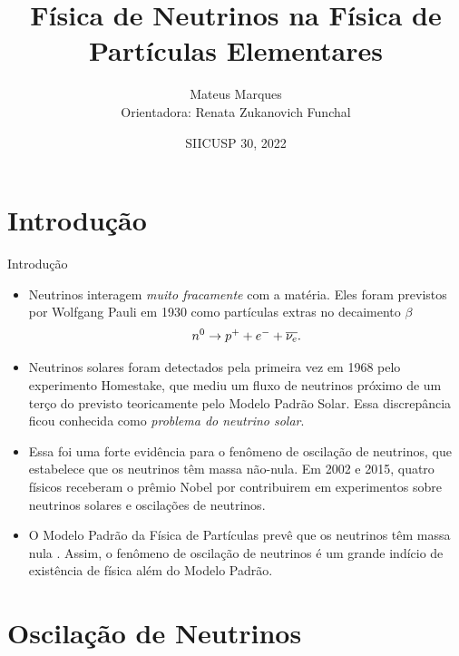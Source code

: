 \documentclass[aspectratio=169]{beamer}
\title[Física de Neutrinos na Física de Partículas Elementares]{\LARGE{Física de Neutrinos na Física de Partículas Elementares}}
\author[Mateus Marques]{\large{Mateus Marques}\\[2ex]\small{Orientadora: Renata Zukanovich Funchal}}
\institute[]{\small{Instituto de Física da Universidade de São Paulo}}
\date[SIICUSP 30, 2022]{\small{SIICUSP 30, 2022}}
\begin{document}
\begin{frame}
  \titlepage
\end{frame}

\section{Introdução}

\begin{frame}{Introdução}

\begin{itemize}
%
\item Neutrinos interagem \textit{muito fracamente} com a matéria. Eles foram previstos por Wolfgang Pauli em 1930 como partículas extras no decaimento $\beta$
\begin{equation} \label{eq:beta}
n^0 \to p^+ + e^- + \overline{\nu_e}.
\end{equation}

\item Neutrinos solares foram detectados pela primeira vez em 1968 pelo experimento Homestake, que mediu um fluxo de neutrinos próximo de um terço do previsto teoricamente pelo Modelo Padrão Solar. Essa discrepância ficou conhecida como \textit{problema do neutrino solar}.

\item Essa foi uma forte evidência para o fenômeno de oscilação de neutrinos, que estabelece que os neutrinos têm massa não-nula. Em 2002 e 2015, quatro físicos receberam o prêmio Nobel por contribuirem em experimentos sobre neutrinos solares e oscilações de neutrinos.

\item O Modelo Padrão da Física de Partículas prevê que os neutrinos têm massa nula \cite{gonzalez}. Assim, o fenômeno de oscilação de neutrinos é um grande indício de existência de física além do Modelo Padrão.

%
\end{itemize}



\end{frame}

\section{Oscilação de Neutrinos}
\end{document}
